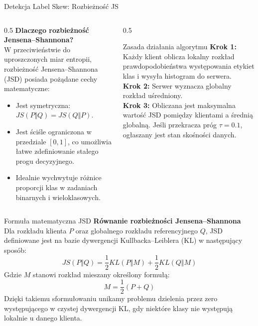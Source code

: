\documentclass[9pt,aspectratio=169]{beamer}
\begin{document}
\begin{frame}{Detekcja Label Skew: Rozbieżność JS}
\begin{columns}[T]
\begin{column}{0.5\textwidth}
\textbf{Dlaczego rozbieżność Jensena--Shannona?}\\[4pt]
W przeciwieństwie do uproszczonych miar entropii, rozbieżność Jensena--Shannona (JSD) posiada pożądane cechy matematyczne:
\begin{itemize}\footnotesize
\item Jest symetryczna: $JS(P\Vert Q) = JS(Q\Vert P)$.
\item Jest ściśle ograniczona w przedziale $[0,1]$, co umożliwia łatwe zdefiniowanie stałego progu decyzyjnego.
\item Idealnie wychwytuje różnice proporcji klas w zadaniach binarnych i wieloklasowych.
\end{itemize}
\end{column}
\begin{column}{0.5\textwidth}
\begin{infobox}{Zasada działania algorytmu}
\textbf{Krok 1:} Każdy klient oblicza lokalny rozkład prawdopodobieństwa występowania etykiet klas i wysyła histogram do serwera.\\[3pt]
\textbf{Krok 2:} Serwer wyznacza globalny rozkład uśredniony.\\[3pt]
\textbf{Krok 3:} Obliczana jest maksymalna wartość JSD pomiędzy klientami a średnią globalną. Jeśli przekracza próg $\tau=0.1$, ogłaszany jest stan skośności danych.
\end{infobox}
\end{column}
\end{columns}
\end{frame}

\begin{frame}{Formuła matematyczna JSD}
\textbf{Równanie rozbieżności Jensena--Shannona}\\[6pt]
Dla rozkładu klienta $P$ oraz globalnego rozkładu referencyjnego $Q$, JSD definiowane jest na bazie dywergencji Kullbacka--Leiblera (KL) w następujący sposób:
\[
JS(P\Vert Q) = \frac{1}{2}KL(P\Vert M) + \frac{1}{2}KL(Q\Vert M)
\]
Gdzie $M$ stanowi rozkład mieszany określony formułą:
\[
M = \frac{1}{2}(P+Q)
\]
Dzięki takiemu sformułowaniu unikamy problemu dzielenia przez zero występującego w czystej dywergencji KL, gdy niektóre klasy nie występują lokalnie u danego klienta.
\end{frame}
\end{document}
